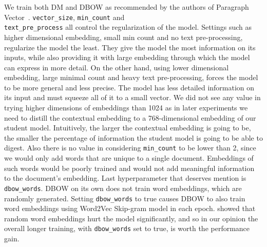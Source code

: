 We train both DM and DBOW as recommended by the authors of Paragraph
Vector~\citep{le2014distributed}. \texttt{vector\_size}, \texttt{min\_count} and
\\ \texttt{text\_pre\_process} all control the regularization of the model.
Settings such as higher dimensional embedding, small min count and no text
pre-processing, regularize the model the least. They give the model the most
information on its inputs, while also providing it with large embedding through
which the model can express in more detail. On the other hand, using lower
dimensional embedding, large minimal count and heavy text pre-processing, forces
the model to be more general and less precise. The model has less detailed
information on its input and must squeeze all of it to a small vector. We did
not see any value in trying higher dimensions of embeddings than 1024 as in
later experiments we need to distill the contextual embedding to a
768-dimensional embedding of our student model. Intuitively, the larger the
contextual embedding is going to be, the smaller the percentage of information
the student model is going to be able to digest. Also there is no value in
considering \texttt{min\_count} to be lower than 2, since we would only add
words that are unique to a single document. Embeddings of such words would be
poorly trained and would not add meaningful information to the document's
embedding. Last hyperparameter that deserves mention is \texttt{dbow\_words}.
DBOW on its own does not train word embeddings, which are randomly generated.
Setting \texttt{dbow\_words} to true causes DBOW to also train word embeddings
using Word2Vec Skip-gram model in each epoch. \cite{lau2016empirical} showed
that random word embeddings hurt the model significantly, and so in our opinion
the overall longer training, with \texttt{dbow\_words} set to true, is worth the
performance gain.

